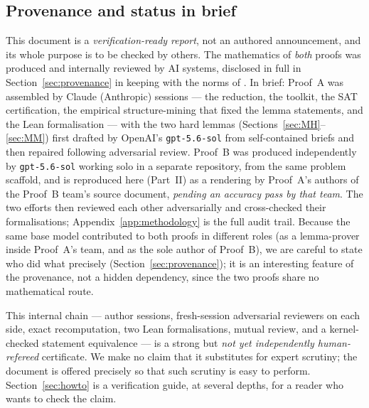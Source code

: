 \documentclass[11pt,reqno]{amsart}
\theoremstyle{definition}
\theoremstyle{remark}
\begin{document}
\subsection{Provenance and status in brief}\label{ssec:method}
This document is a \emph{verification-ready report}, not an authored announcement, and
its whole purpose is to be checked by others. The mathematics of \emph{both} proofs was
produced and internally reviewed by AI systems, disclosed in full in
Section~\ref{sec:provenance} in keeping with the norms of \cite{Bloom617}. In brief:
Proof~A was assembled by Claude (Anthropic) sessions --- the reduction, the toolkit, the
SAT certification, the empirical structure-mining that fixed the lemma statements, and
the Lean formalisation --- with the two hard lemmas
(Sections~\ref{sec:MH}--\ref{sec:MM}) first drafted by OpenAI's \texttt{gpt-5.6-sol}
from self-contained briefs and then repaired following adversarial review. Proof~B was
produced independently by \texttt{gpt-5.6-sol} working solo in a separate repository,
from the same problem scaffold, and is reproduced here (Part~II) as a rendering by
Proof~A's authors of the Proof~B team's source document, \emph{pending an accuracy pass
by that team}. The two efforts then reviewed each other adversarially and cross-checked
their formalisations; Appendix~\ref{app:methodology} is the full audit trail. Because
the same base model contributed to both proofs in different roles (as a lemma-prover
inside Proof~A's team, and as the sole author of Proof~B), we are careful to state who
did what precisely (Section~\ref{sec:provenance}); it is an interesting feature of the
provenance, not a hidden dependency, since the two proofs share no mathematical route.

This internal chain --- author sessions, fresh-session adversarial reviewers on each
side, exact recomputation, two Lean formalisations, mutual review, and a kernel-checked
statement equivalence --- is a strong but \emph{not yet independently human-refereed}
certificate. We make no claim that it substitutes for expert scrutiny; the document is
offered precisely so that such scrutiny is easy to perform. Section~\ref{sec:howto} is a
verification guide, at several depths, for a reader who wants to check the claim.
\end{document}

